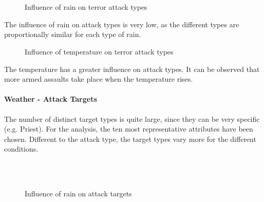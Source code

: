 \begin{figure}[!ht]
\centering
    \qquad\\
    \qquad
    \qquad\\
    \qquad
\caption{Influence of rain on terror attack types}
\end{figure}

The influence of rain on attack types is very low, as the different types are proportionally similar for each type of rain.

\newpage

\begin{figure}[!ht]
\centering
    \qquad
    \qquad
    \qquad
    \qquad
    \qquad
\caption{Influence of temperature on terror attack types}
\label{fig:example subfigure}
\end{figure}

The temperature has a greater influence on attack types. It can be observed that more armed assaults take place when the temperature rises.

\newpage

\paragraph{Weather - Attack Targets}
The number of distinct target types is quite large, since they can be very specific (e.g. Priest). For the analysis, the ten most representative attributes have been chosen. Different to the attack type, the target types vary more for the different conditions.

\begin{figure}[!ht]
\centering
    \qquad\\
    \qquad
    \qquad\\
    \qquad
\caption{Influence of rain on attack targets}
\end{figure}

